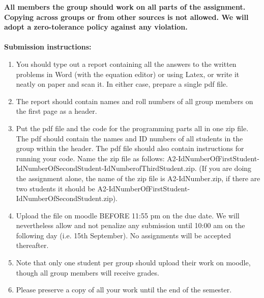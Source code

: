 \documentclass[11pt]{article}
\begin{document}
\maketitle


\textbf{All members the group should work on all parts of the assignment. Copying across groups or from other sources is not allowed. We will adopt a \textbf{zero-tolerance policy} against any violation.}
\\
\\
\textbf{Submission instructions:} 
\begin{enumerate}
\item You should type out a report containing all the answers to the written problems in Word (with the equation editor) or using Latex, or write it neatly on paper and scan it. In either case, prepare a single pdf file. 
\item The report should contain names and roll numbers of all group members on the first page as a header.
\item Put the pdf file and the code for the programming parts all in one zip file. The pdf should contain the names and ID numbers of all students in the group within the header. The pdf file should also contain instructions for running your code. Name the zip file as follows: A2-IdNumberOfFirstStudent-IdNumberOfSecondStudent-IdNumberofThirdStudent.zip. (If you are doing the assignment alone, the name of the zip file is A2-IdNumber.zip, if there are two students it should be A2-IdNumberOfFirstStudent-IdNumberOfSecondStudent.zip). 
\item Upload the file on moodle BEFORE 11:55 pm on the due date. We will nevertheless allow and not penalize any submission until 10:00 am on the following day (i.e. 15th September). No assignments will be accepted thereafter. 
\item Note that only one student per group should upload their work on moodle, though all group members will receive grades. 
\item Please preserve a copy of all your work until the end of the semester. 
\end{enumerate}
\end{document}
